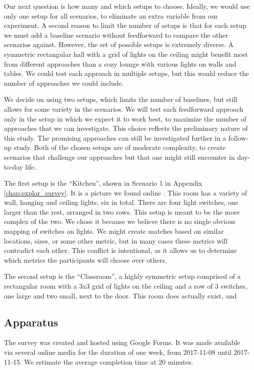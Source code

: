     Our next question is how many and which setups to choose. Ideally, we would use only one setup for all scenarios, to eliminate an extra variable from our experiment. A second reason to limit the number of setups is that for each setup we must add a baseline scenario without feedforward to compare the other scenarios against. However, the set of possible setups is extremely diverse. A symmetric rectangular hall with a grid of lights on the ceiling might benefit most from different approaches than a cozy lounge with various lights on walls and tables. We could test each approach in multiple setups, but this would reduce the number of approaches we could include.
    
    We decide on using two setups, which limits the number of baselines, but still allows for some variety in the scenarios. We will test each feedforward approach only in the setup in which we expect it to work best, to maximize the number of approaches that we can investigate. This choice reflects the preliminary nature of this study. The promising approaches can still be investigated further in a follow-up study. Both of the chosen setups are of moderate complexity, to create scenarios that challenge our approaches but that one might still encounter in day-to-day life. 
    
    The first setup is the ``Kitchen'', shown in Scenario 1 in Appendix \ref{chap:explor_survey}. It is a picture we found online \cite{FileTROY82:online}. This room has a variety of wall, hanging and ceiling lights, six in total. There are four light switches, one larger than the rest, arranged in two rows. This setup is meant to be the more complex of the two. We chose it because we believe there is no single obvious mapping of switches on lights. We might create matches based on similar locations, sizes, or some other metric, but in many cases these metrics will contradict each other. This conflict is intentional, as it allows us to determine which metrics the participants will choose over others.
    
    The second setup is the ``Classroom'', a highly symmetric setup comprised of a rectangular room with a 3x3 grid of lights on the ceiling and a row of 3 switches, one large and two small, next to the door. This room does actually exist, and 

    \subsection{Apparatus} \label{subsec:explor:survey:apparatus}
    The survey was created and hosted using Google Forms. It was made available via several online media for the duration of one week, from 2017-11-08 until 2017-11-15. We estimate the average completion time at 20 minutes.

